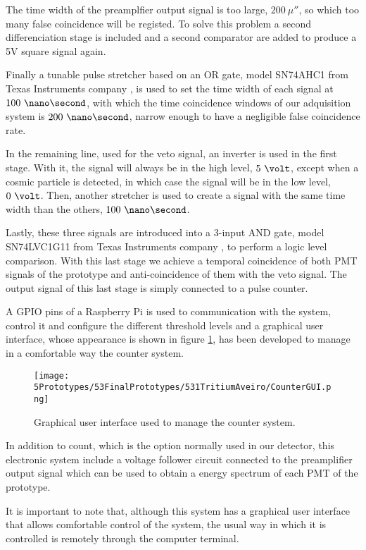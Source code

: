 The time width of the preamplfier output signal is too large, $200~\mu\second$, so which too many false coincidence will be registed. To solve this problem a second differenciation stage is included and a second comparator are added to produce a 5V square signal again.

Finally a tunable pulse stretcher based on an OR gate, model SN74AHC1 from Texas Instruments company \cite{Stretcher}, is used to set the time width of each signal at $100~\nano\second$, with which the time coincidence windows of our adquisition system is $200~\nano\second$, narrow enough to have a negligible false coincidence rate.

In the remaining line, used for the veto signal, an inverter is used in the first stage. With it, the signal will always be in the high level, $5~\volt$, except when a cosmic particle is detected, in which case the signal will be in the low level, $0~\volt$. Then, another stretcher is used to create a signal with the same time width than the others, $100~\nano\second$.

Lastly, these three signals are introduced into a 3-input AND gate, model SN74LVC1G11 from Texas Instruments company \cite{ANDGate}, to perform a logic level comparison. With this last stage we achieve a temporal coincidence of both PMT signals of the prototype and anti-coincidence of them with the veto signal. The output signal of this last stage is simply connected to a pulse counter. 

A GPIO pins of a Raspberry Pi is used to communication with the system, control it and configure the different threshold levels and a graphical user interface, whose appearance is shown in figure \ref{fig:GUIcounts}, has been developed to manage in a comfortable way the counter system.

 \begin{figure}[h]
\centering
\texttt{[image: 5Prototypes/53FinalPrototypes/531TritiumAveiro/CounterGUI.png]}
\caption{Graphical user interface used to manage the counter system. \label{fig:GUIcounts}}
\end{figure}

In addition to count, which is the option normally used in our detector, this electronic system include a voltage follower circuit connected to the preamplifier output signal which can be used to obtain a energy spectrum of each PMT of the prototype.

It is important to note that, although this system has a graphical user interface that allows comfortable control of the system, the usual way in which it is controlled is remotely through the computer terminal.

